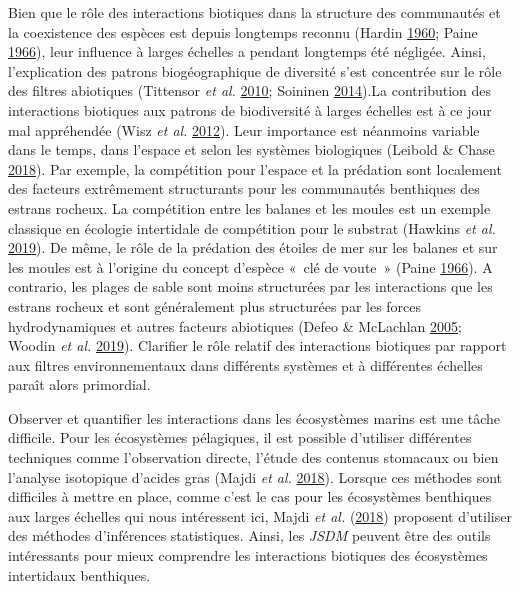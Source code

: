 \documentclass[12pt,]{article}
\begin{document}
Bien que le rôle des interactions biotiques dans la structure des
communautés et la coexistence des espèces est depuis longtemps reconnu
(Hardin \protect\hyperlink{ref-Hardin_1960}{1960}; Paine
\protect\hyperlink{ref-Paine_1966}{1966}), leur influence à larges
échelles a pendant longtemps été négligée. Ainsi, l'explication des
patrons biogéographique de diversité s'est concentrée sur le rôle des
filtres abiotiques (Tittensor \emph{et al.}
\protect\hyperlink{ref-Tittensor_2010}{2010}; Soininen
\protect\hyperlink{ref-Soininen_2014}{2014}).La contribution des
interactions biotiques aux patrons de biodiversité à larges échelles est
à ce jour mal appréhendée (Wisz \emph{et al.}
\protect\hyperlink{ref-Wisz_2012}{2012}). Leur importance est néanmoins
variable dans le temps, dans l'espace et selon les systèmes biologiques
(Leibold \& Chase \protect\hyperlink{ref-Leibold_2018}{2018}). Par
exemple, la compétition pour l'espace et la prédation sont localement
des facteurs extrêmement structurants pour les communautés benthiques
des estrans rocheux. La compétition entre les balanes et les moules est
un exemple classique en écologie intertidale de compétition pour le
substrat (Hawkins \emph{et al.}
\protect\hyperlink{ref-Hawkins_2019}{2019}). De même, le rôle de la
prédation des étoiles de mer sur les balanes et sur les moules est à
l'origine du concept d'espèce «~clé de voute~» (Paine
\protect\hyperlink{ref-Paine_1966}{1966}). A contrario, les plages de
sable sont moins structurées par les interactions que les estrans
rocheux et sont généralement plus structurées par les forces
hydrodynamiques et autres facteurs abiotiques (Defeo \& McLachlan
\protect\hyperlink{ref-Defeo_2005}{2005}; Woodin \emph{et al.}
\protect\hyperlink{ref-Woodin_2019}{2019}). Clarifier le rôle relatif
des interactions biotiques par rapport aux filtres environnementaux dans
différents systèmes et à différentes échelles paraît alors primordial.

Observer et quantifier les interactions dans les écosystèmes marins est
une tâche difficile. Pour les écosystèmes pélagiques, il est possible
d'utiliser différentes techniques comme l'observation directe, l'étude
des contenus stomacaux ou bien l'analyse isotopique d'acides gras (Majdi
\emph{et al.} \protect\hyperlink{ref-Majdi_2018}{2018}). Lorsque ces
méthodes sont difficiles à mettre en place, comme c'est le cas pour les
écosystèmes benthiques aux larges échelles qui nous intéressent ici,
Majdi \emph{et al.} (\protect\hyperlink{ref-Majdi_2018}{2018}) proposent
d'utiliser des méthodes d'inférences statistiques. Ainsi, les
\emph{JSDM} peuvent être des outils intéressants pour mieux comprendre
les interactions biotiques des écosystèmes intertidaux benthiques.
\end{document}
